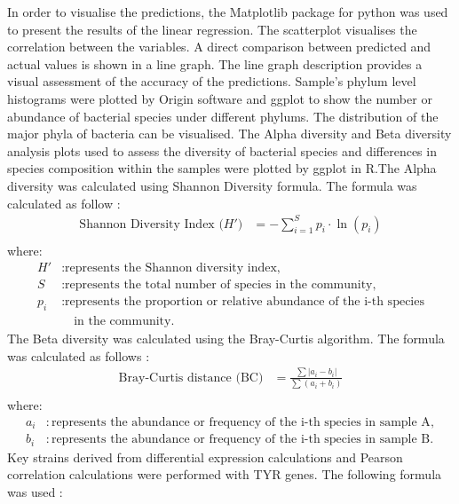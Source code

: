 \documentclass[12pt]{article}
\begin{document}
In order to visualise the predictions, the Matplotlib package \citep{barrett2005matplotlib} for python was used to present the results of the linear regression. The scatterplot visualises the correlation between the variables. A direct comparison between predicted and actual values is shown in a line graph. The line graph description provides a visual assessment of the accuracy of the predictions. Sample's phylum level histograms were plotted by Origin software \citep{edwards2002origin} and ggplot \citep{wickham2006introduction} to show the number or abundance of bacterial species under different phylums. The distribution of the major phyla of bacteria can be visualised. The Alpha diversity and Beta diversity analysis plots used to assess the diversity of bacterial species and differences in species composition within the samples were plotted by ggplot in R.The Alpha diversity was calculated using Shannon Diversity formula. The formula was calculated as follow \citep{nolan2006beachcomber}:
\begin{align*}
\text{Shannon Diversity Index (} H' \text{)} & = - \sum_{i=1}^{S} p_i \cdot \ln(p_i) \\
\end{align*}
where:
\begin{align*}
H' & : \text{represents the Shannon diversity index,} \\
S & : \text{represents the total number of species in the community,} \\
p_i & : \text{represents the proportion or relative abundance of the i-th species}\\
& \quad \text{in the community.}
\end{align*}
The Beta diversity was calculated using the Bray-Curtis algorithm. The formula was calculated as follows \citep{beals1984bray}: 
\begin{align*}
\text{Bray-Curtis distance (BC)} & = \frac{\sum{|a_i - b_i|}}{\sum{(a_i + b_i)}} \\
\end{align*}
where:
\begin{align*}
a_i & : \text{represents the abundance or frequency of the i-th species in sample A}, \\
b_i & : \text{represents the abundance or frequency of the i-th species in sample B}.
\end{align*}
Key strains derived from differential expression calculations and Pearson correlation calculations were performed with TYR genes. The following formula was used \citep{cohen2009pearson}: 
\end{document}
